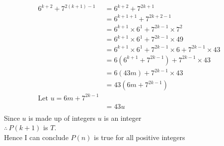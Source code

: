 \documentclass[12pt letter]{report}
\begin{document}
\begin{myproof}
  \begin{align*}
    6^{k + 2} + 7^{2 \left( k + 1 \right) - 1 } & = 6^{k + 2} + 7^{2k + 1}                                         \\
                                                & = 6^{k + 1 + 1} + 7^{2k + 2 - 1}                                 \\
                                                & = 6^{k + 1}\times 6^{1} + 7^{2k - 1} \times 7^{2}                \\
                                                & =  6^{k + 1}\times 6^{1} + 7^{2k - 1} \times 49                  \\
                                                & = 6^{k+ 1}\times 6^1 + 7^{2k - 1}\times 6 + 7^{2k - 1} \times 43 \\
                                                & = 6 \left( 6^{k + 1} + 7^{2k - 1} \right) + 7^{2k - 1} \times 43 \\
                                                & = 6 \left( 43m \right) + 7^{2k - 1} \times 43                    \\
                                                & =  43 \left( 6m + 7^{2k - 1} \right)                             \\
    \text{Let } u = 6m + 7^{2k - 1}                                                                                \\
                                                & = 43u                                                            \\
  \end{align*}
  Since $u$ is made up of integers $u$ is an integer \\
  $\therefore \, P \left( k + 1 \right) $ is $T$. \\
  Hence I can conclude $P \left( n \right) $ is true for all positive integers
\end{myproof}

\end{document}
